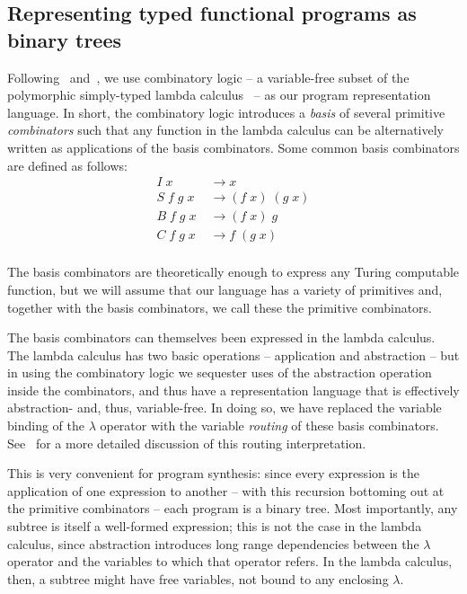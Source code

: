 \documentclass{article}
\begin{document}
\subsection{Representing typed functional programs as binary trees}

Following~\cite{liang10programs} and~\cite{Briggs:2008}, we use
combinatory logic -- a variable-free subset of the polymorphic
simply-typed lambda calculus~\cite{Pierce_2002} -- as
our program representation language. In short, the combinatory logic
introduces a \emph{basis} of several primitive \emph{combinators} such
that any function in the lambda calculus can be alternatively written
as applications of the basis combinators. Some common basis
combinators are defined as follows:
\begin{align}
I\; x &\rightarrow  x \\
S\; f\; g\; x\; &\rightarrow (f\; x)\; (g\; x) \\ 
B\; f\; g\; x\; &\rightarrow (f\; x)\; g \\ 
C\; f\; g\; x\; &\rightarrow f\; (g\; x) \\ 
\end{align}

The basis
combinators are theoretically enough to express any Turing computable
function, but we will assume that our language has a variety of
primitives and, together with the basis combinators, we call these the
primitive combinators.

The basis combinators can themselves been expressed in the lambda
calculus. The lambda calculus has two basic operations -- application
and abstraction -- but in using the combinatory logic we sequester
uses of the abstraction operation inside the combinators, and thus
have a representation language that is effectively abstraction- and,
thus, variable-free. In doing so, we have replaced the variable
binding of the $\lambda$ operator with the variable \emph{routing} of
these basis combinators. See~\cite{liang10programs} for a more
detailed discussion of this routing interpretation. 

This is very convenient for program synthesis: since every expression
is the application of one expression to another -- with this recursion
bottoming out at the primitive combinators -- each program is a binary
tree. Most importantly, any subtree is itself a well-formed
expression; this is not the case in the lambda calculus, since
abstraction introduces long range dependencies between the $\lambda$
operator and the variables to which that operator refers. In the
lambda calculus, then, a subtree might have free variables, not bound
to any enclosing $\lambda$. 
\end{document}
